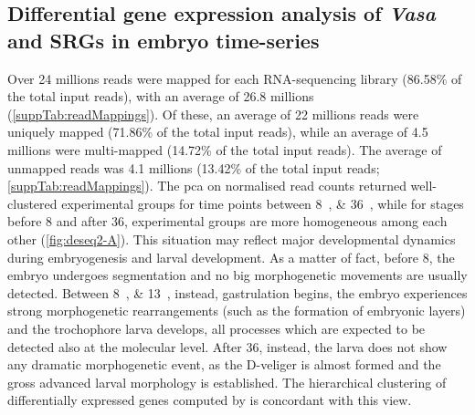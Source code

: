 \subsection{Differential gene expression analysis of \textit{Vasa} and SRGs in embryo time-series} \label{chapter:insitu-DGE}
Over 24 millions reads were mapped for each RNA-sequencing library (86.58\% of the total input reads), with an average of 26.8 millions (\cref{suppTab:readMappings}). Of these, an average of 22 millions reads were uniquely mapped (71.86\% of the total input reads), while an average of 4.5 millions were multi-mapped (14.72\% of the total input reads). The average of unmapped reads was 4.1 millions (13.42\% of the total input reads; \cref{suppTab:readMappings}). The \gls{pca} on normalised read counts returned well-clustered experimental groups for time points between \qtylist{8;36}{\hpf}, while for stages before \qty{8}{\hpf} and after \qty{36}{\hpf}, experimental groups are more homogeneous among each other (\cref{fig:deseq2-A}). This situation may reflect major developmental dynamics during embryogenesis and larval development. As a matter of fact, before \qty{8}{\hpf}, the embryo undergoes segmentation and no big morphogenetic movements are usually detected. Between \qtylist{8;13}{\hpf}, instead, gastrulation begins, the embryo experiences strong morphogenetic rearrangements (such as the formation of embryonic layers) and the trochophore larva develops, all processes which are expected to be detected also at the molecular level. After \qty{36}{\hpf}, instead, the larva does not show any dramatic morphogenetic event, as the D-veliger is almost formed and the gross advanced larval morphology is established. The hierarchical clustering of differentially expressed genes computed by  is concordant with this view.

